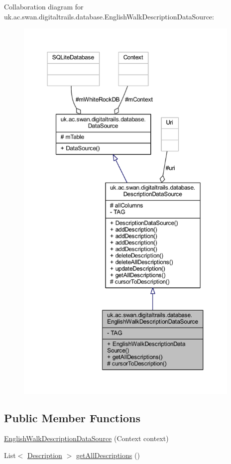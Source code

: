 Collaboration diagram for uk.\+ac.\+swan.\+digitaltrails.\+database.\+English\+Walk\+Description\+Data\+Source\+:
\nopagebreak
\begin{figure}[H]
\begin{center}
\leavevmode
\includegraphics[height=550pt]{classuk_1_1ac_1_1swan_1_1digitaltrails_1_1database_1_1_english_walk_description_data_source__coll__graph}
\end{center}
\end{figure}
\subsection*{Public Member Functions}
\begin{DoxyCompactItemize}
\item 
\hyperlink{classuk_1_1ac_1_1swan_1_1digitaltrails_1_1database_1_1_english_walk_description_data_source_ab463a69262359e4fce59134708d557b3}{English\+Walk\+Description\+Data\+Source} (Context context)
\item 
List$<$ \hyperlink{classuk_1_1ac_1_1swan_1_1digitaltrails_1_1components_1_1_description}{Description} $>$ \hyperlink{classuk_1_1ac_1_1swan_1_1digitaltrails_1_1database_1_1_english_walk_description_data_source_a068a47671969c7357d0614135fd19d36}{get\+All\+Descriptions} ()
\end{DoxyCompactItemize}
